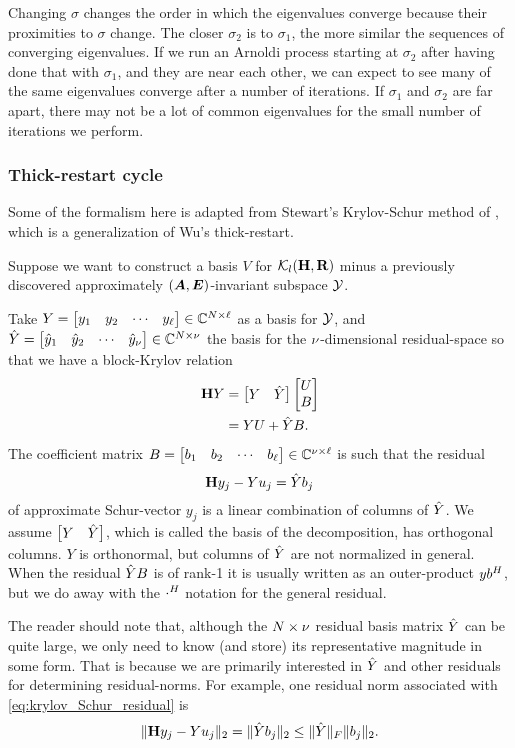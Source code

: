 Changing $\sigma$ changes the order in which the eigenvalues converge because their proximities to $\sigma$ change.   The closer $\sigma_2$ is to $\sigma_1$, the more similar the sequences of converging eigenvalues.    If we run an Arnoldi process starting at $\sigma_2$ after having done that with $\sigma_1$, and they are near each other, we can expect to see many of the same eigenvalues converge after a number of iterations.    If  $\sigma_1$ and $\sigma_2$ are far apart, there may not be a lot of common eigenvalues for the small number of iterations we perform.       


\subsubsection{Thick-restart cycle}
 Some of the formalism here is adapted from Stewart's Krylov-Schur method of \cite{stewart2002krylov,stewart2002addendum}, which is a generalization of Wu's thick-restart.   

Suppose we want to construct a basis $V$ for  $\mathcal{K}_{l}({\textbf{\textup{H}}},{\textbf{\textup{R}}})$ minus a previously discovered approximately $(\bm{A},\bm{E})$-invariant subspace $\mathcal{Y}$.

Take $Y=\begin{bmatrix} y_1 & y_2 & \cdots & y_\ell\end{bmatrix}\in\mathbb{C}^{N\times \ell}$ as a basis for $\mathcal{Y}$, and  $\hat{Y}=\begin{bmatrix} \hat{y}_1 & \hat{y}_2 &\cdots&\hat{y}_\nu\end{bmatrix}\in\mathbb{C}^{N\times \nu}$ the basis for the $\nu$-dimensional residual-space so that we have a block-Krylov relation
\begin{equation}
\begin{aligned}
\textbf{\textup{H}} Y &= \begin{bmatrix} Y & \hat{Y}\end{bmatrix}\begin{bmatrix} U\\  B\end{bmatrix}\\
&= Y U +  \hat{Y} B.
\label{eq:deflated_decomp}
\end{aligned}
\end{equation}
The coefficient matrix $B=\begin{bmatrix} b_1&b_2&\cdots&b_\ell\end{bmatrix}\in\mathbb{C}^{\nu \times \ell}$ is such that the residual 
\begin{equation}
\textbf{\textup{H}} y_j - Y u_j =  \hat{Y} b_j
\label{eq:krylov_Schur_residual}
\end{equation}
 of approximate Schur-vector $y_j$  is a linear combination of columns of $\hat{Y}$.
We assume $\begin{bmatrix} Y & \hat{Y}\end{bmatrix}$, which is called the basis of the decomposition, has orthogonal columns.  $Y$ is orthonormal, but columns of  $\hat{Y}$ are not normalized in general.   When the residual $\hat{Y} B$  is of rank-1 it is usually written as an outer-product $yb^H$, but we do away with the $\cdot^H$ notation for the general residual. 

  The reader should note that, although the $N\times\nu$ residual basis matrix $\hat{Y}$ can be quite large, we only need to know (and store) its representative magnitude  in some form.  That is because we are primarily interested in $\hat{Y}$ and other residuals for determining residual-norms.  For example, one residual norm associated with \eqref{eq:krylov_Schur_residual} is 
\begin{equation}
\| \textbf{\textup{H}} y_j - Y u_j \|_2 = \|\hat{Y} b_j \|_2 \leq \| \hat{Y} \|_F \| b_j\|_2. 
\label{eq:krylov_Schur_residual_norm}
\end{equation}


